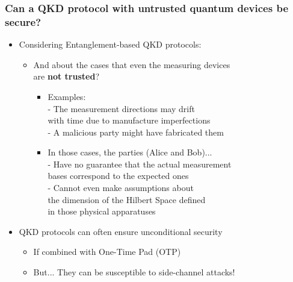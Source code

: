 \documentclass{beamer}
\begin{document}
		\begin{frame}
			\frametitle{\normalsize Can a QKD protocol with untrusted quantum devices be secure?}

            \vspace{2.5ex}
            \begin{itemize}
                \item Considering Entanglement-based QKD protocols:
                \begin{itemize}\small
                    \item And about the cases that even the measuring devices\\ are \textbf{not trusted}?
                    \begin{itemize}
                        \item Examples:\\
                         - The measurement directions may drift\\\hspace{0.8ex} with time due to manufacture imperfections\\
                         - A malicious party might have fabricated them
                        \item In those cases, the parties (Alice and Bob)...\\
                         - Have no guarantee that the actual measurement\\\hspace{0.8ex}  bases correspond to the expected ones\\
                         - Cannot even make assumptions about\\\hspace{0.8ex}  the dimension of the Hilbert Space defined\\\hspace{0.8ex} in those physical apparatuses
                    \end{itemize}
                \end{itemize}
                \item QKD protocols can often ensure unconditional security
                \begin{itemize}
                    \item If combined with One-Time Pad (OTP)
                    \item But... They can be susceptible to side-channel attacks!
                \end{itemize}
            \end{itemize}
		\end{frame}
\end{document}
